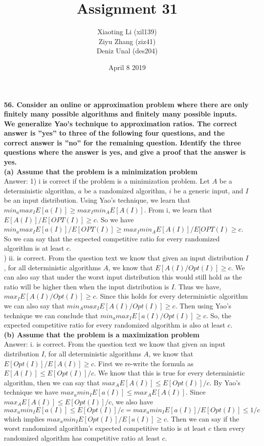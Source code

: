 \documentclass{article}
\title{Assignment 31}
\author{Xiaoting Li (xil139) \\
Ziyu Zhang (ziz41) \\
Deniz Unal (des204)}
\date{April 8 2019}
\begin{document}
\maketitle
\noindent
\textbf{56. Consider an online or approximation problem where there are only finitely many possible algorithms and finitely many possible inputs. We generalize Yao’s technique to approximation ratios. The correct answer is ”yes” to three of the following four questions, and the correct answer is ”no” for the remaining question. Identify the three questions where the answer is yes, and give a proof that the answer is yes.} \\ \newline
\textbf{(a) Assume that the problem is a minimization problem} \\ \newline
Answer: 1) i is correct if the problem is a minimization problem. Let $A$ be a deterministic algorithm, $a$ be a randomized algorithm, $i$ be a generic input, and $I$ be an input distribution. Using Yao's technique, we learn that $min_a max_I E[a(I)] \geq max_I min_A E[A(I)]$. From i, we learn that $E[A(I)]/E[OPT(I)] \geq c$. So we have $min_a max_I E[a(I)]/E[OPT(I)] \geq max_I min_A E[A(I)]/E[OPT(I) \geq c$. So we can say that the expected competitive ratio for every randomized algorithm is at least $c$. \\ ) ii. is correct. From the question text we know that given an input distribution $I$, for all deterministic algorithms $A$, we know that $E[A(I) / Opt(I)] \geq c$. We can also say that under the worst input distribution this would still hold as the ratio will be higher then when the input distribution is $I$. Thus we have, $max_I E[A(I) / Opt(I)] \geq c$. Since this holds for every deterministic algorithm we can also say that $min_A max_I E[A(I) / Opt(I)] \geq c$. Then using Yao's technique we can conclude that $min_a max_I E[a(I) / Opt(I)] \geq c$. So, the expected competitive ratio for every randomized algorithm is also at least $c$. \\ \newline
\textbf{(b) Assume that the problem is a maximization problem} \\ \newline
Answer: i. is correct. From the question text we know that given an input distribution $I$, for all deterministic algorithms $A$, we know that $E[Opt(I)] / E[A(I)] \geq c$. First we re-write the formula as $E[A(I)] \leq E[Opt(I)] / c$. We know that this is true for every deterministic algorithm, then we can say that $max_A E[A(I)] \leq E[Opt(I)] / c$. By Yao's technique we have $max_a min_I E[a(I)] \leq max_A E[A(I)]$. Since $max_A E[A(I)] \leq E[Opt(I)] / c$, we also have $max_a min_I E[a(I)] \leq E[Opt(I)] / c = max_a min_I E[a(I)] / E[Opt(I)] \leq 1 / c$ which implies $max_a min_I E[Opt(I)] / E[a(I)] \geq c$. Then we can say if the worst randomized algorithm's expected competitive tatio is at least $c$ then every randomized algorithm has competitive ratio at least $c$. \\ \newline
\end{document}
